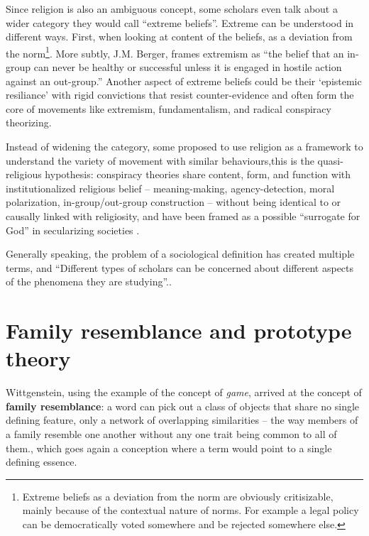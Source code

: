 Since religion is also an ambiguous concept, some scholars even talk about a wider category they would call ``extreme beliefs''. 
Extreme can be understood in different ways. First, when looking at content of the beliefs, as a deviation from the norm\footnote{Extreme beliefs as a deviation from the norm are obviously critisizable, mainly because of the contextual nature of norms. For example a legal policy can be democratically voted somewhere and be rejected somewhere else.}. 
More subtly, J.M. Berger, frames extremism as \enquote{the belief that an in-group can never be healthy or successful unless it is engaged in hostile action against an out-group.}\autocite{bergerExtremism2018}
Another aspect of extreme beliefs could be their `epistemic resiliance' with rigid convictions that resist counter-evidence and often form the core of movements like extremism, fundamentalism, and radical conspiracy theorizing.\autocite{bortolottiExtremeBeliefsUnshakable2025}

Instead of widening the category, some proposed to use religion as a framework to understand the variety of movement with similar behaviours,this is the quasi-religious hypothesis: conspiracy theories share content, form, and function with institutionalized religious belief -- meaning-making, agency-detection, moral polarization, in-group/out-group construction -- without being identical to or causally linked with religiosity, and have been framed as a possible ``surrogate for God'' in secularizing societies \autocite[pp.2]{franksConspiracyTheoriesQuasireligious2013}. 

Generally speaking, the problem of a sociological definition has created multiple terms, and \enquote{Different types of scholars can be concerned about different aspects of the phenomena they are studying}.\autocite[pp.239]{barkerNotsonewReligiousMovements2014}.


\section{Family resemblance and prototype theory}\label{sec:prototype_theory}
Wittgenstein, using the example of the concept of \textit{game}, arrived at the concept of \textbf{family resemblance}: a word can pick out a class of objects that share no single defining feature, only a network of overlapping similarities -- the way members of a family resemble one another without any one trait being common to all of them.\autocite{wittgensteinPhilosophischeUntersuchungenPhilosophical2010}, which goes again a conception where a term would point to a single defining essence.

